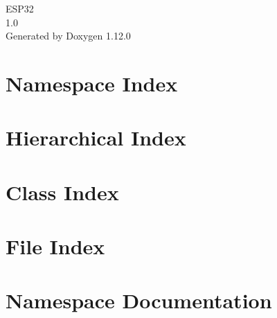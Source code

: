 \documentclass[twoside]{book}
\newcommand{\+}{\discretionary{\mbox{\scriptsize$\hookleftarrow$}}{}{}}
\newcommand{\clearemptydoublepage}{%
    \newpage{\pagestyle{empty}\cleardoublepage}%
  }
\begin{document}
  \raggedbottom
    \hypersetup{pageanchor=false,
                bookmarksnumbered=true,
                pdfencoding=unicode
               }
  \begin{titlepage}
  \vspace*{7cm}
  \begin{center}%
  {\Large ESP32}\\
  [1ex]\large 1.\+0 \\
  \vspace*{1cm}
  {\large Generated by Doxygen 1.12.0}\\
  \end{center}
  \end{titlepage}
  \clearemptydoublepage
  \tableofcontents
  \clearemptydoublepage
  \hypersetup{pageanchor=true}

\chapter{Namespace Index}

\chapter{Hierarchical Index}

\chapter{Class Index}

\chapter{File Index}

\chapter{Namespace Documentation}











\end{document}
